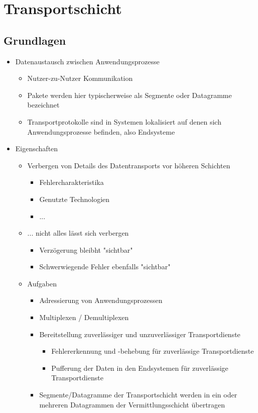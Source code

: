 \newpage
\section{Transportschicht}
  \subsection{Grundlagen}
    \begin{itemize}
      \item Datenaustausch zwischen Anwendungsprozesse
        \begin{itemize}
          \item Nutzer-zu-Nutzer Kommunikation
          \item Pakete werden hier typischerweise als Segmente oder Datagramme bezeichnet
          \item Transportprotokolle sind in Systemen lokalisiert auf denen sich Anwendungsprozesse
            befinden, also Endsysteme
        \end{itemize}
      \item Eigenschaften
        \begin{itemize}
          \item Verbergen von Details des Datentransports vor höheren Schichten
            \begin{itemize}
              \item Fehlercharakteristika
              \item Genutzte Technologien
              \item ...
            \end{itemize}
          \item ... nicht alles lässt sich verbergen
            \begin{itemize}
              \item Verzögerung bleibht "sichtbar"
              \item Schwerwiegende Fehler ebenfalls "sichtbar"
            \end{itemize}
          \item Aufgaben
            \begin{itemize}
              \item Adressierung von Anwendungsprozessen
              \item Multiplexen / Demultiplexen
              \item Bereitstellung zuverlässiger und unzuverlässiger Transportdienste
                \begin{itemize}
                  \item Fehlererkennung und -behebung für zuverlässige Transportdienste
                  \item Pufferung der Daten in den Endsystemen für zuverlässige Transportdienste
                \end{itemize}
              \item Segmente/Datagramme der Transportschicht werden in ein oder mehreren Datagrammen
                der Vermittlungsschicht übertragen
            \end{itemize}
        \end{itemize}
    \end{itemize}
